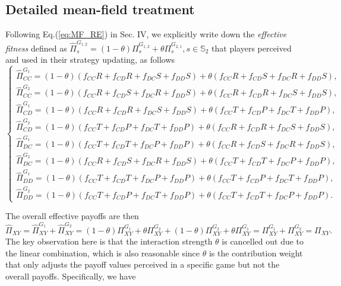 \documentclass[showpacs,superscriptaddress,reprint,nofootinbib,amsmath,amssymb,aps,pre]{revtex4-1}
\begin{document}
\appendix
\begin{widetext}
\section{Detailed mean-field treatment}\label{app:A}
\setcounter{equation}{0}
\renewcommand{\theequation}{A\arabic{equation}}
Following Eq.(\ref{eq:MF_RE}) in Sec. IV, we explicitly write down the \emph{effective fitness} defined as $\widehat{\Pi}_{s}^{G_{1,2}}=(1-\theta)\Pi_{s}^{G_{1,2}}+\theta\Pi_{s}^{G_{2,1}}, s\in\mathbb{S}_2$ that players perceived and used in their strategy updating, as follows
\begin{equation}
     \left\{
                \begin{array}{ll}
                \widehat{\Pi}_{CC}^{G_1}=(1-\theta)(f_{CC}R+f_{CD}R+f_{DC}S+f_{DD}S)+\theta(f_{CC}R+f_{CD}S+f_{DC}R+f_{DD}S),\\
		\widehat{\Pi}_{CC}^{G_2}=(1-\theta)(f_{CC}R+f_{CD}S+f_{DC}R+f_{DD}S)+\theta(f_{CC}R+f_{CD}R+f_{DC}S+f_{DD}S),\\
		\widehat{\Pi}_{CD}^{G_1}=(1-\theta)(f_{CC}R+f_{CD}R+f_{DC}S+f_{DD}S)+\theta (f_{CC}T+f_{CD}P+ f_{DC}T+ f_{DD}P),\\
		\widehat{\Pi}_{CD}^{G_2}=(1-\theta)(f_{CC}T+f_{CD}P+f_{DC}T+f_{DD}P)+\theta (f_{CC}R+f_{CD}R+ f_{DC}S+ f_{DD}S),\\
		\widehat{\Pi}_{DC}^{G_1}=(1-\theta)(f_{CC}T+f_{CD}T+f_{DC}P+f_{DD}P)+\theta (f_{CC}R+f_{CD}S+ f_{DC}R+f_{DD}S),\\
		\widehat{\Pi}_{DC}^{G_2}=(1-\theta)(f_{CC}R+f_{CD}S+f_{DC}R+f_{DD}S)+\theta (f_{CC}T+ f_{CD}T+ f_{DC}P+f_{DD}P),\\
		\widehat{\Pi}_{DD}^{G_1}=(1-\theta)(f_{CC}T+f_{CD}T+f_{DC}P+f_{DD}P)+\theta(f_{CC}T+f_{CD}P+f_{DC}T+f_{DD}P),\\
		\widehat{\Pi}_{DD}^{G_2}=(1-\theta)(f_{CC}T+f_{CD}P+f_{DC}T+f_{DD}P)+\theta(f_{CC}T+f_{CD}T+f_{DC}P+f_{DD}P).
                \end{array}
        \right. 
\end{equation}

The overall effective payoffs are then
\begin{equation}
\widehat{\Pi}_{XY}=\widehat{\Pi}^{G_1}_{XY}+\widehat{\Pi}^{G_2}_{XY}=(1-\theta)\Pi^{G_1}_{XY}+\theta\Pi^{G_2}_{XY}+
(1-\theta)\Pi^{G_2}_{XY}+\theta\Pi^{G_1}_{XY}=\Pi^{G_1}_{XY}+\Pi^{G_2}_{XY}=\Pi_{XY}. 
\end{equation}\label{eq:pi_overall}
The key observation here is that the interaction strength $\theta$ is cancelled out due to the linear combination, which is also reasonable since $\theta$ is the contribution weight that only adjusts the payoff values perceived in a specific game but not the overall payoffs.
Specifically, we have


\end{widetext}
\end{document}
